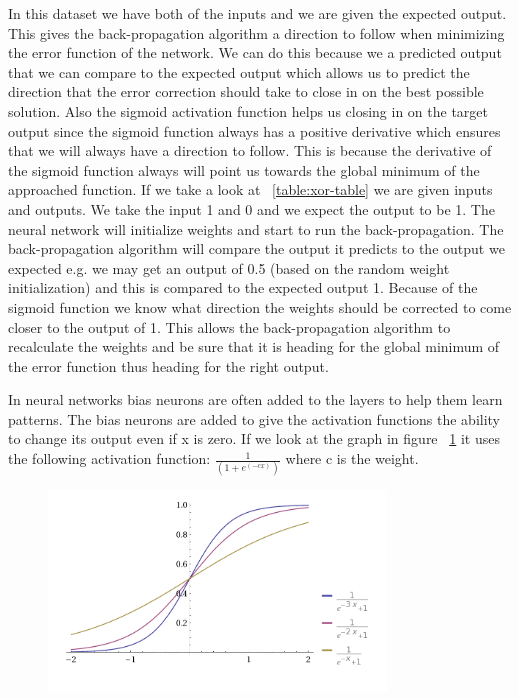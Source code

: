 In this dataset we have both of the inputs and we are given the expected output. This gives the back-propagation algorithm a direction to follow when minimizing the error function of the network. We can do this because we a predicted output that we can compare to the expected output which allows us to predict the direction that the error correction should take to close in on the best possible solution. Also the sigmoid activation function helps us closing in on the target output since the sigmoid function always has a positive derivative which ensures that we will always have a direction to follow\cite[p. 153]{rojas1996neural}. This is because the derivative of the sigmoid function always will point us towards the global minimum of the approached function. If we take a look at ~\ref{table:xor-table} we are given inputs and outputs. We take the input 1 and 0 and we expect the output to be 1. The neural network will initialize weights and start to run the back-propagation. The back-propagation algorithm will compare the output it predicts to the output we expected e.g. we may get an output of 0.5 (based on the random weight initialization) and this is compared to the expected output 1. Because of the sigmoid function we know what direction the weights should be corrected to come closer to the output of 1. This allows the back-propagation algorithm to recalculate the weights and be sure that it is heading for the global minimum of the error function thus heading for the right output.

In neural networks bias neurons are often added to the layers to help them learn patterns. The bias neurons are added to give the activation functions the ability to change its output even if x is zero. If we look at the graph in figure ~\ref{fig:activationFunctions} it uses the following activation function: \begin{math} \frac{1}{(1+e^{(-cx)})} \end{math} where c is the weight.

\begin{figure}[!ht]
\centering
\includegraphics[width=0.8\textwidth ,natwidth=410,natheight=237]{billeder/ActivationFunctions.png}
\caption{}
\label{fig:activationFunctions}
\end{figure}

